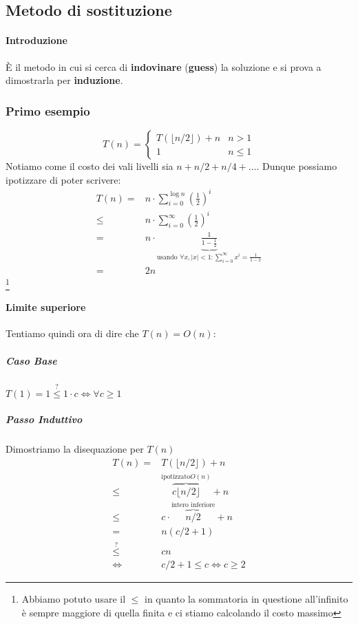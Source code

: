     \subsection{Metodo di sostituzione}
        \paragraph{Introduzione} È il metodo in cui si cerca di \textbf{indovinare} (\textbf{guess}) la soluzione e si prova a dimostrarla per \textbf{induzione}.
        \subsubsection{Primo esempio}
            $$ T(n) = \begin{cases} T(\lfloor n/2 \rfloor) + n & n>1 \\ 1 & n\leq 1 \end{cases} $$
            Notiamo come il costo dei vali livelli sia $ n + n/2 + n/4 + \ldots $. Dunque possiamo ipotizzare di poter scrivere:
            $$
                \begin{aligned}
                    T(n)=& n \cdot \sum_{i=0}^{\log n}\left(\frac{1}{2}\right)^i\\
                    \leq & n \cdot \sum_{i=0}^{\infty}\left(\frac{1}{2}\right)^i\\
                    = & n \cdot \underbrace{\frac{1}{1-\frac{1}{2}}}_{\text{usando }\forall x,|x| < 1: \sum_{i=0}^{\infty}x^i=\frac{1}{1-x}}\\
                    = & 2n
                \end{aligned}
            $$
            \footnote{Abbiamo potuto usare il $ \leq $ in quanto la sommatoria in questione all'infinito è sempre maggiore di quella finita e ci stiamo calcolando il costo massimo}
            \paragraph{Limite superiore}
                Tentiamo quindi ora di dire che $ T(n) = O(n) $:
                \subparagraph{Caso Base} $ T(1) = 1 \stackrel{?}{\leq} 1 \cdot c \Leftrightarrow \forall c\geq 1 $
                \subparagraph{Passo Induttivo} Dimostriamo la disequazione per $T(n)$
                $$
                    \begin{aligned}
                        T(n) = & T(\lfloor n/2 \rfloor) + n \\
                        \leq & \overbrace{c\lfloor n/2 \rfloor}^{\text{ipotizzato} O(n)} + n \\
                        \leq & c\cdot\overbrace{n/2}^{\text{intero inferiore}} + n \\
                        = & n(c/2 + 1) \\
                        \stackrel{?}{\leq} & cn \\
                        \Leftrightarrow & c/2 + 1 \leq c \Leftrightarrow c\geq 2
                    \end{aligned}
                $$
                
